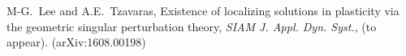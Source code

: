 \documentclass[a4paper,11pt]{article}
\begin{document}
\begin{thebibliography}{10}
%
%
%
%
%
%
%
%
%
%

{\sc M-G.~Lee and A.E.~Tzavaras},
Existence of localizing solutions in plasticity via the geometric singular perturbation theory,
{\em SIAM J. Appl. Dyn. Syst.}, (to appear). (arXiv:1608.00198)


\hrulefill


\end{thebibliography}
\end{document}
